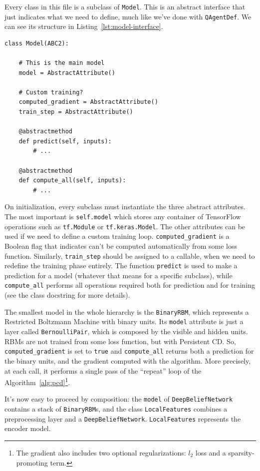 Every class in this file is a subclass of \texttt{Model}. This is an abstract
interface that just indicates what we need to define, much like we've done
with \texttt{QAgentDef}. We can see its structure in
Listing~\ref{lst:model-interface}.
\begin{lstlisting}[style=floatpy, label=lst:model-interface,
	caption={The interface of every model definition.}]
class Model(ABC2):

    # This is the main model
    model = AbstractAttribute()

    # Custom training?
    computed_gradient = AbstractAttribute()
    train_step = AbstractAttribute()

    @abstractmethod
    def predict(self, inputs):
        # ...

    @abstractmethod
    def compute_all(self, inputs):
        # ...
\end{lstlisting}
On initialization, every subclass must instantiate the three abstract
attributes. The most important is \verb|self.model| which stores any container
of TensorFlow operations such as \verb|tf.Module| or \verb|tf.keras.Model|.
The other attributes can be used if we need to define a custom training loop.
\verb|computed_gradient| is a Boolean flag that indicates can't be computed
automatically from some loss function. Similarly, \verb|train_step| should be
assigned to a callable, when we need to redefine the training phase entirely.
The function \texttt{predict} is used to make a prediction for a model
(whatever that means for a specific subclass), while \verb|compute_all|
performs all operations required both for prediction and for training (see the
class docstring for more details).

The smallest model in the whole hierarchy is the \texttt{BinaryRBM}, which
represents a Restricted Boltzmann Machine with binary units. Its
\texttt{model} attribute is just a layer called \texttt{BernoulliPair}, which
is composed by the visible and hidden units. RBMs are not trained from some
loss function, but with Persistent CD. So, \verb|computed_gradient| is set to
\lstinline[style=inlinepy]|true| and \verb|compute_all| returns both a
prediction for the binary units, and the gradient computed with the algorithm.
More precisely, at each call, it performs a single pass of the ``repeat'' loop
of the Algorithm~\vref{alg:pcd}\footnote{The gradient also includes two
optional regularizations: $l_2$ loss and a sparsity-promoting term.}.

It's now easy to proceed by composition: the \texttt{model} of
\texttt{DeepBeliefNetwork} contains a stack of \texttt{BinaryRBM}s, and the
class \texttt{LocalFeatures} combines a preprocessing layer and a
\texttt{DeepBeliefNetwork}. \texttt{LocalFeatures} represents the encoder
model.

